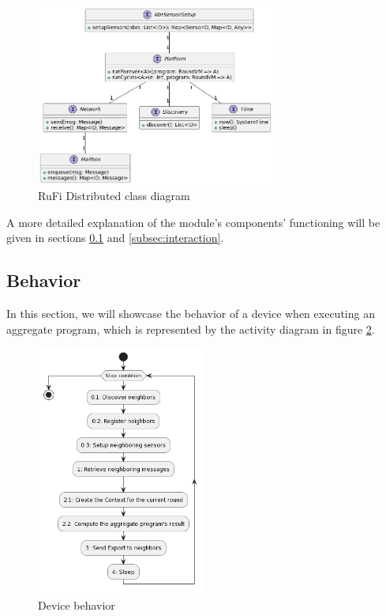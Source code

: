\begin{figure}[ht!]
    \centering
    \includegraphics[width=0.7\textwidth]{figures/diagrams/img/rufi-distributed-class.png}
    \caption{RuFi Distributed class diagram}
    \label{fig:distributed-class}
\end{figure}

A more detailed explanation of the module's components' functioning will be given in sections \ref{subsec:behavior} and \ref{subsec:interaction}.

\subsection{Behavior}
\label{subsec:behavior}
In this section, we will showcase the behavior of a device when executing an aggregate program, which is represented by the activity diagram in figure \ref{fig:behavior}.

\begin{figure}[ht!]
    \centering
    \includegraphics[width=0.5\textwidth]{figures/diagrams/img/platform-activity.png}
    \caption{Device behavior}
    \label{fig:behavior}
\end{figure}

